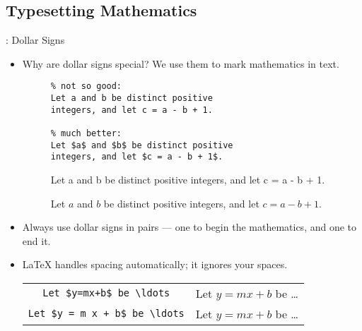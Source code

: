 \subsection{Typesetting Mathematics}

\begin{frame}[fragile]{\insertsubsection{}: Dollar Signs}
    \begin{itemize}
        \item Why are dollar signs \keystrokebftt{\$} special? We use them to mark mathematics in text.\\[1ex]
              \begin{figure}
                  \begin{minipage}{0.5\textwidth}
                      \begin{lstlisting}
% not so good:
Let a and b be distinct positive
integers, and let c = a - b + 1.

% much better:
Let $a$ and $b$ be distinct positive
integers, and let $c = a - b + 1$.
                    \end{lstlisting}
                  \end{minipage}
                  \begin{minipage}{0.35\textwidth}
                      Let a and b be distinct positive
                      integers, and let c = a - b + 1.

                      Let $a$ and $b$ be distinct positive
                      integers, and let $c = a - b + 1$.
                  \end{minipage}
              \end{figure}
        \item Always use dollar signs in pairs --- one to begin the mathematics, and one
              to end it.
        \item \LaTeX{} handles spacing automatically; it ignores your spaces.
              \begin{table}
                  \begin{tabular}{cl}
                      \verb|Let $y=mx+b$ be \ldots|      & Let $y=mx+b$ be \ldots      \\
                      \verb|Let $y = m x + b$ be \ldots| & Let $y = m x + b$ be \ldots
                  \end{tabular}
              \end{table}
    \end{itemize}
\end{frame}

